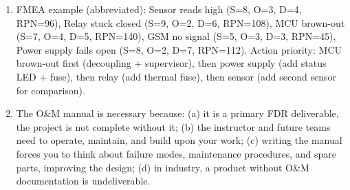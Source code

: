\begin{enumerate}[leftmargin=1.5em]
\item FMEA example (abbreviated): Sensor reads high (S=8, O=3, D=4, RPN=96), Relay stuck closed (S=9, O=2, D=6, RPN=108), MCU brown-out (S=7, O=4, D=5, RPN=140), GSM no signal (S=5, O=3, D=3, RPN=45), Power supply fails open (S=8, O=2, D=7, RPN=112). Action priority: MCU brown-out first (decoupling + supervisor), then power supply (add status LED + fuse), then relay (add thermal fuse), then sensor (add second sensor for comparison).
\item The O\&M manual is necessary because: (a) it is a primary FDR deliverable, the project is not complete without it; (b) the instructor and future teams need to operate, maintain, and build upon your work; (c) writing the manual forces you to think about failure modes, maintenance procedures, and spare parts, improving the design; (d) in industry, a product without O\&M documentation is undeliverable.
\end{enumerate}



